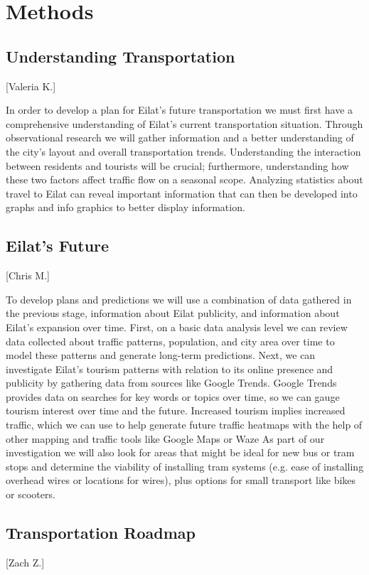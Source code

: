 \documentclass[12pt]{article}                         %
\begin{document}
\newpage
\section{Methods}

\subsection{Understanding Transportation}[Valeria K.]

In order to develop a plan for Eilat's future transportation we must first have a comprehensive understanding of Eilat's current transportation situation. Through observational research we will gather information and a better understanding of the city's layout and overall transportation trends. Understanding the interaction between residents and tourists will be crucial; furthermore, understanding how these two factors affect traffic flow on a seasonal scope. Analyzing statistics about travel to Eilat can reveal important information that can then be developed into graphs and info graphics to better display information.

\subsection{Eilat's Future}[Chris M.]

To develop plans and predictions we will use a combination of data gathered in the previous stage, information about Eilat publicity, and information about Eilat's expansion over time. First, on a basic data analysis level we can review data collected about traffic patterns, population, and city area over time to model these patterns and generate long-term predictions. Next, we can investigate Eilat's tourism patterns with relation to its online presence and publicity by gathering data from sources like Google Trends. Google Trends provides data on searches for key words or topics over time, so we can gauge tourism interest over time and the future. Increased tourism implies increased traffic, which we can use to help generate future traffic heatmaps with the help of other mapping and traffic tools like Google Maps or Waze As part of our investigation we will also look for areas that might be ideal for new bus or tram stops and determine the viability of installing tram systems (e.g. ease of installing overhead wires or locations for wires), plus options for small transport like bikes or scooters.

\subsection{Transportation Roadmap}[Zach Z.]
\end{document}
